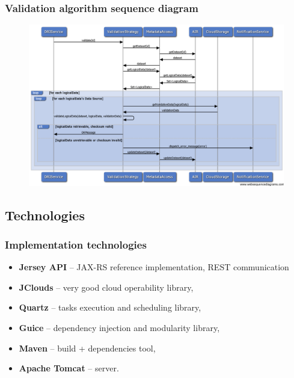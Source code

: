 \documentclass[compress]{beamer}
\begin{document}
\begin{frame}
\frametitle{\textbf{Validation algorithm sequence diagram}}
\begin{figure}
	\centering
	\includegraphics[width=\textwidth]{img/algorithm2.png}
\end{figure}
\end{frame}

\subsection{Technologies}
\begin{frame}
\frametitle{\textbf{Implementation technologies}}
\begin{itemize}
	\item \textbf{Jersey API} -- JAX-RS reference implementation, REST communication
	\item \textbf{JClouds} -- very good cloud operability library,
	\item \textbf{Quartz} -- tasks execution and scheduling library,
	\item \textbf{Guice} -- dependency injection and modularity library,
	\item \textbf{Maven} -- build + dependencies tool,
	\item \textbf{Apache Tomcat} -- server. 
\end{itemize}
\end{frame}
\end{document}
